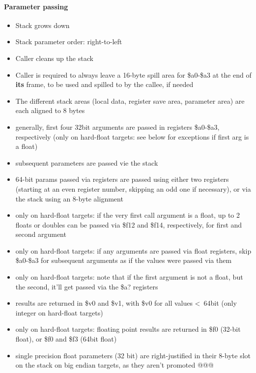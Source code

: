 \paragraph{Parameter passing}

\begin{itemize}
\item Stack grows down
\item Stack parameter order: right-to-left
\item Caller cleans up the stack
\item Caller is required to always leave a 16-byte spill area for \$a0-\$a3 at the end of {\bf its} frame, to be used and spilled to by the callee, if needed
\item The different stack areas (local data, register save area, parameter area) are each aligned to 8 bytes
\item generally, first four 32bit arguments are passed in registers \$a0-\$a3, respectively (only on hard-float targets: see below for exceptions if first arg is a float)
\item subsequent parameters are passed vie the stack
\item 64-bit params passed via registers are passed using either two registers (starting at an even register number, skipping an odd one if necessary), or via the stack using an 8-byte alignment
\item only on hard-float targets: if the very first call argument is a float, up to 2 floats or doubles can be passed via \$f12 and \$f14, respectively, for first and second argument
\item only on hard-float targets: if any arguments are passed via float registers, skip \$a0-\$a3 for subsequent arguments as if the values were passed via them
\item only on hard-float targets: note that if the first argument is not a float, but the second, it'll get passed via the \$a? registers
\item results are returned in \$v0 and \$v1, with \$v0 for all values \textless\ 64bit (only integer on hard-float targets)
\item only on hard-float targets: floating point results are returned in \$f0 (32-bit float), or \$f0 and \$f3 (64bit float)
\item single precision float parameters (32 bit) are right-justified in their 8-byte slot on the stack on big endian targets, as they aren't promoted @@@
\end{itemize}

